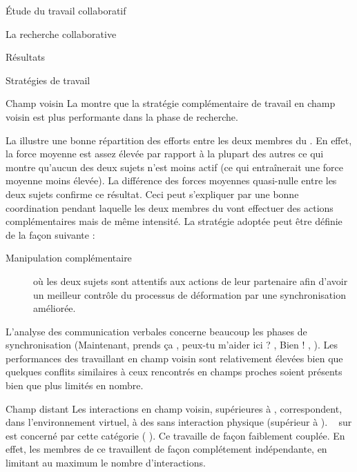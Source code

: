 \documentclass[myfrancais]{mythesis}
\begin{document}
\begin{mypart}{Étude du travail collaboratif}
\begin{mychapter}{La recherche collaborative}
\begin{mysection}{Résultats}
\begin{mysubsection}{Stratégies de travail}
\begin{mysubsubsection}{Champ voisin}
						La  montre que la stratégie complémentaire de travail en champ voisin est plus performante dans la phase de recherche.

						La  illustre une bonne répartition des efforts entre les deux membres du .
						En effet, la force moyenne est assez élevée par rapport à la plupart des autres  ce qui montre qu'aucun des deux sujets n'est moins actif (ce qui entraînerait une force moyenne moins élevée).
						La différence des forces moyennes quasi-nulle entre les deux sujets confirme ce résultat.
						Ceci peut s'expliquer par une bonne coordination pendant laquelle les deux membres du  vont effectuer des actions complémentaires mais de même intensité.
						La stratégie adoptée peut être définie de la façon suivante :
						\begin{description}
							\item[Manipulation complémentaire] où les deux sujets sont attentifs aux actions de leur partenaire afin d'avoir un meilleur contrôle du processus de déformation par une synchronisation améliorée.
						\end{description}
						L'analyse des communication verbales concerne beaucoup les phases de synchronisation (\og Maintenant, prends ça \fg, \og peux-tu m'aider ici ? \fg, \og Bien ! \fg, \myetc).
						Les performances des  travaillant en champ voisin sont relativement élevées bien que quelques conflits similaires à ceux rencontrés en champs proches soient présents bien que plus limités en nombre.
					\end{mysubsubsection}
					\begin{mysubsubsection}{Champ distant}
						Les interactions en champ voisin, supérieures à , correspondent, dans l'environnement virtuel, à des  sans interaction physique (supérieur à ).
						~ sur  est concerné par cette catégorie ( ).
						Ce  travaille de façon faiblement couplée.
						En effet, les membres de ce  travaillent de façon complétement indépendante, en limitant au maximum le nombre d'interactions.


\end{mysubsubsection}
\end{mysubsection}
\end{mysection}
\end{mychapter}
\end{mypart}
\end{document}
